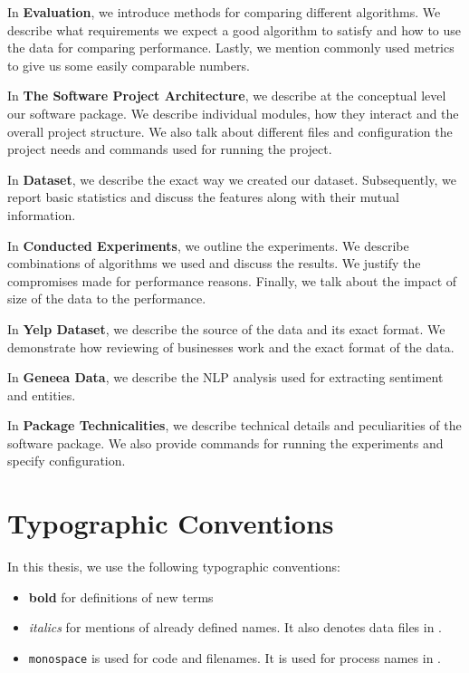 In \textbf{ Evaluation}, we introduce methods for comparing different algorithms.
We describe what requirements we expect a good algorithm to satisfy and how to use the data for comparing performance.
Lastly, we mention commonly used metrics to give us some easily comparable numbers.

In \textbf{ The Software Project Architecture}, we describe at the conceptual level our software package.
We describe individual modules, how they interact and the overall project structure.
We also talk about different files and configuration the project needs and commands used for running the project.

In \textbf{ Dataset}, we describe the exact way we created our dataset.
Subsequently, we report basic statistics and discuss the features along with their mutual information.

In \textbf{ Conducted Experiments}, we outline the experiments.
We describe combinations of algorithms we used and discuss the results.
We justify the compromises made for performance reasons.
Finally, we talk about the impact of size of the data to the performance.

In \textbf{ Yelp Dataset},
we describe the source of the data and its exact format.
We demonstrate how reviewing of businesses work and
the exact format of the data.

In \textbf{ Geneea Data},
we describe the NLP analysis used for extracting sentiment and entities.

In \textbf{ Package Technicalities},
we describe technical details and peculiarities of the software package.
We also provide commands for running the experiments and specify configuration.




\section{Typographic Conventions}

In this thesis, we use the following typographic conventions:

\begin{itemize}
\item \textbf{bold} for definitions of new terms

\item \textit{italics} for mentions of already defined names. It also denotes data files in .

\item \texttt{monospace} is used for code and filenames. It is used for process names in .

\end{itemize}

